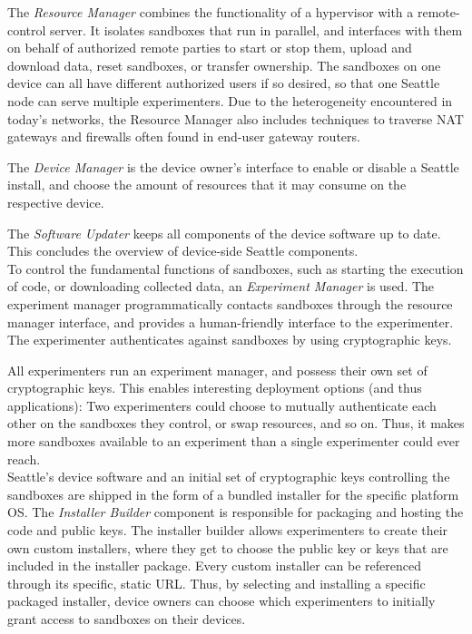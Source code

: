 The \textit{Resource Manager} combines the functionality of
a hypervisor with a remote-control server.
It isolates %
sandboxes that run in
parallel, and interfaces with them on behalf of authorized remote
parties to start or stop them, upload and download data, reset
sandboxes, or transfer ownership. The sandboxes on one
device can all have different authorized users if so desired,
so that one Seattle node can serve multiple experimenters.
Due to the heterogeneity encountered in today's networks,
the Resource Manager also includes techniques to traverse
\gls{NAT} gateways and firewalls often found in end-user
gateway routers.

The \textit{Device Manager} %
is the device owner's interface to enable or disable a Seattle
install, and choose the amount of resources that it may consume on the respective
device.

The \textit{Software Updater} keeps all components of the
device software up to date. This concludes the overview of
device-side Seattle components.
\\

To control the fundamental functions of sandboxes, such as
starting the execution of code, or downloading collected data,
an \textit{Experiment Manager} %
is used. The experiment manager programmatically contacts sandboxes
through the resource manager interface, and provides a human-friendly
interface to the experimenter. The experimenter
authenticates against sandboxes by using cryptographic keys.

All experimenters run an experiment manager, and possess
their own set of cryptographic keys. This enables interesting
deployment options (and thus applications):
Two experimenters could choose to mutually authenticate each
other on the sandboxes they control, or swap resources, and
so on. Thus, it makes more sandboxes available to an experiment than
a single experimenter could ever reach.
\\

Seattle's device software and an initial set of cryptographic
keys controlling the sandboxes are shipped in the form of a bundled
installer for the specific platform \gls{OS}.
The \textit{Installer Builder} component is responsible for
packaging and hosting the code and public keys.
The installer builder allows experimenters to create their own
custom installers, where they get to choose the public key or keys
that are included in the installer package. Every custom installer
can be referenced through its specific, static \gls{URL}.
Thus, by selecting and installing a specific packaged installer,
device owners can choose which experimenters to initially grant
access to sandboxes on their devices.
\\

